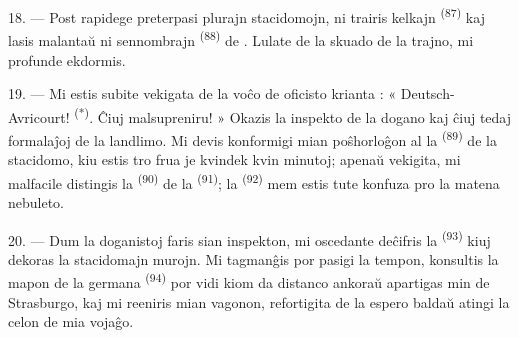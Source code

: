 18. --- Post rapidege preterpasi plurajn stacidomojn, ni trairis kelkajn
 \textsuperscript{(87)} kaj lasis malantaŭ ni 
sennombrajn \textsuperscript{(88)} de . Lulate de la
skuado de la trajno, mi profunde ekdormis.

\VUsaut{3.0mm}
\VUsaut{3.0mm}

19. --- Mi estis subite vekigata de la voĉo de oficisto krianta :
« Deutsch-Avricourt! \textsuperscript{(*)}. Ĉiuj malsupreniru! » Okazis la
inspekto de la dogano kaj ĉiuj tedaj formalaĵoj de la landlimo. Mi devis
konformigi mian poŝhorloĝon al la  \textsuperscript{(89)} de
la stacidomo, kiu estis tro frua je kvindek kvin minutoj; apenaŭ vekigita, mi
malfacile distingis la  \textsuperscript{(90)} de la
 \textsuperscript{(91)}; la 
\textsuperscript{(92)} mem estis tute konfuza pro la matena nebuleto.

20. --- Dum la doganistoj faris sian inspekton, mi oscedante deĉifris la
 \textsuperscript{(93)} kiuj dekoras la stacidomajn murojn. Mi
tagmanĝis por pasigi la tempon, konsultis la mapon de la germana 
\textsuperscript{(94)} por vidi kiom da distanco ankoraŭ apartigas min de
Strasburgo, kaj mi reeniris mian vagonon, refortigita de la espero baldaŭ
atingi la celon de mia vojaĝo.
\VUsaut{6.0mm}
\VUfilet{22mm}
